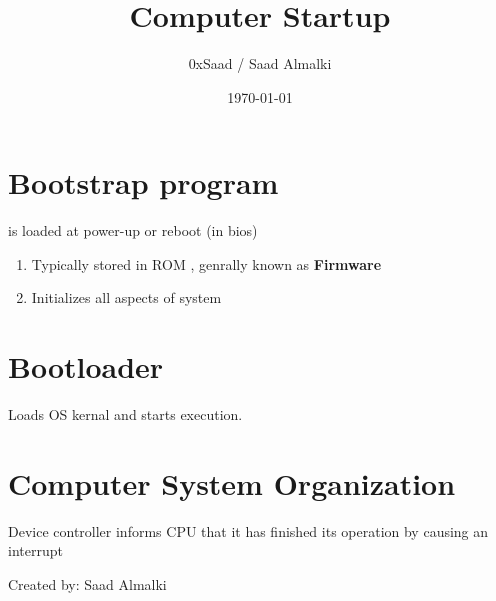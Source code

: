 \documentclass[12pt]{article}
\title{Computer Startup}
\author{0xSaad / Saad Almalki}
\date{\today}
\begin{document}
\maketitle

\section{Bootstrap program}
is loaded at power-up or reboot (in bios)
\begin{enumerate}
  \item Typically stored in ROM , genrally known as \textbf{Firmware}
  \item Initializes all aspects of system
\end{enumerate}

\section{Bootloader}
\begin{enumerate}
Loads OS kernal and starts execution.
\end{enumerate}

\section{Computer System Organization}
\begin{enumerate}
Device controller informs CPU that it has finished its operation by causing an interrupt
\end{enumerate}

\begin{flushright}
Created by: Saad Almalki \\
\end{flushright}
\end{document}
